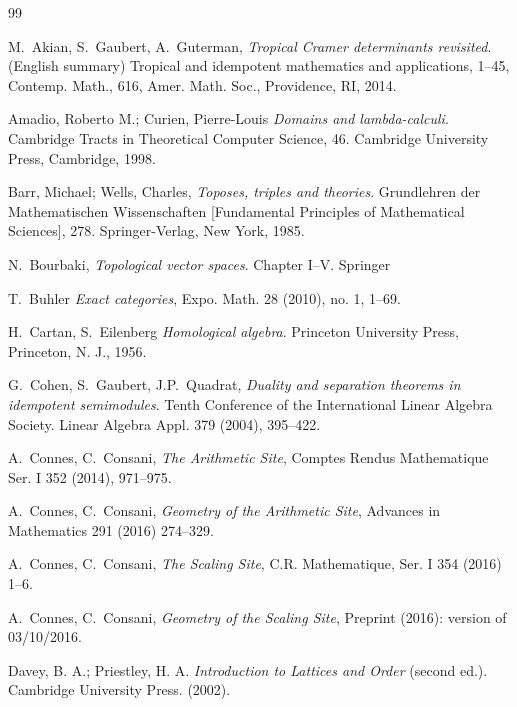 \documentclass[12pt]{article}
\begin{document}
\begin{thebibliography}{99}
 





 M.~Akian,  S.~Gaubert, A.~Guterman, {\em
Tropical Cramer determinants revisited}. (English summary) Tropical and idempotent mathematics and applications, 1--45, 
Contemp. Math., 616, Amer. Math. Soc., Providence, RI, 2014. 

  Amadio, Roberto M.; Curien, Pierre-Louis {\em Domains and lambda-calculi}. Cambridge Tracts in Theoretical Computer Science, 46. Cambridge University Press, Cambridge, 1998. 




 Barr, Michael; Wells, Charles, {\em Toposes, triples and theories}. Grundlehren der Mathematischen Wissenschaften [Fundamental Principles of Mathematical Sciences], 278. Springer-Verlag, New York, 1985.

 N.~Bourbaki, {\em Topological vector spaces}.
  Chapter I--V. Springer 
  
   T.~Buhler {\em Exact categories}, Expo. Math. 28 (2010), no. 1, 1--69.

 H.~Cartan, S.~Eilenberg {\em Homological algebra}. Princeton University Press, Princeton, N. J., 1956.

  G.~Cohen, S.~Gaubert, J.P.~Quadrat, {\em Duality and separation theorems in idempotent semimodules}. Tenth Conference of the International Linear Algebra Society. Linear Algebra Appl. 379 (2004), 395--422.

 A.~Connes, C.~Consani, {\em The Arithmetic Site}, Comptes Rendus Mathematique Ser. I 352 (2014), 971--975.

 A.~Connes, C.~Consani, {\em Geometry of the Arithmetic Site}, Advances in Mathematics 291 (2016) 274--329.

 A.~Connes, C.~Consani, {\em The Scaling Site}, C.R. Mathematique, Ser. I 354 (2016) 1--6.

 A.~Connes, C.~Consani, {\em Geometry of the Scaling Site}, Preprint (2016): version of 03/10/2016.


 Davey, B. A.; Priestley, H. A. {\em Introduction to Lattices and Order} (second ed.). Cambridge University Press. (2002).


\end{thebibliography}
\end{document}
